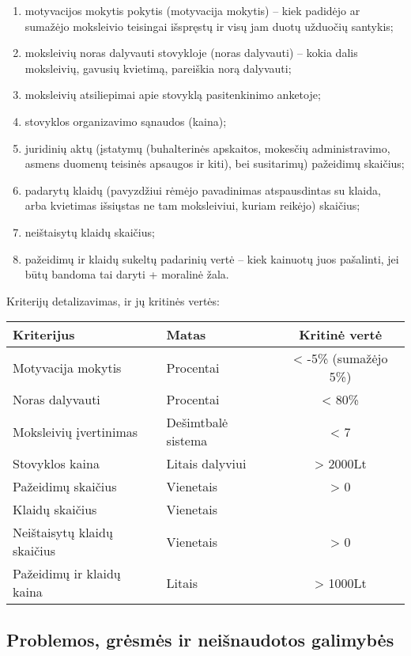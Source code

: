 \begin{enumerate}
  \item motyvacijos mokytis pokytis (motyvacija mokytis) – kiek padidėjo
    ar sumažėjo moksleivio teisingai išspręstų ir visų jam duotų užduočių
    santykis;
  \item moksleivių noras dalyvauti stovykloje (noras dalyvauti) – kokia 
    dalis moksleivių, gavusių kvietimą, pareiškia norą dalyvauti;
  \item moksleivių atsiliepimai apie stovyklą pasitenkinimo anketoje;
  \item stovyklos organizavimo sąnaudos (kaina);
  \item juridinių aktų (įstatymų (buhalterinės apskaitos,
    mokesčių administravimo, asmens duomenų teisinės apsaugos
    ir kiti), bei susitarimų) pažeidimų skaičius;
  \item padarytų klaidų (pavyzdžiui rėmėjo pavadinimas atspausdintas
    su klaida, arba kvietimas išsiųstas ne tam moksleiviui, kuriam 
    reikėjo) skaičius;
  \item neištaisytų klaidų skaičius;
  \item pažeidimų  ir klaidų sukeltų padarinių vertė – kiek kainuotų juos 
    pašalinti, jei būtų bandoma tai daryti + moralinė žala.
\end{enumerate}

Kriterijų detalizavimas, ir jų kritinės vertės:

\begin{tabular}[]{| l | p{2.2cm} | c |}
  \hline
  Kriterijus & Matas & Kritinė vertė \\
  \hline
  Motyvacija mokytis & Procentai & < -5\% (sumažėjo 5\%) \\
  \hline
  Noras dalyvauti & Procentai & < 80\% \\
  \hline
  Moksleivių įvertinimas & Dešimtbalė sistema & < 7 \\
  \hline
  Stovyklos kaina & Litais dalyviui & > 2000Lt \\
  \hline
  Pažeidimų skaičius & Vienetais & > 0 \\
  \hline
  Klaidų skaičius & Vienetais & \\
  \hline
  Neištaisytų klaidų skaičius & Vienetais & > 0 \\
  \hline
  Pažeidimų ir klaidų kaina & Litais & > 1000Lt \\
  \hline
\end{tabular}

\subsection{Problemos, grėsmės ir neišnaudotos galimybės}

